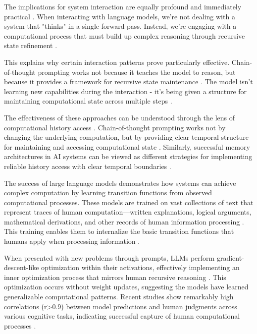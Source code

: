 \documentclass[12pt]{article}
\begin{document}
The implications for system interaction are equally profound and immediately practical \cite{wei2022chain}. When interacting with language models, we're not dealing with a system that "thinks" in a single forward pass. Instead, we're engaging with a computational process that must build up complex reasoning through recursive state refinement \cite{dickson2024trust}.

This explains why certain interaction patterns prove particularly effective. Chain-of-thought prompting works not because it teaches the model to reason, but because it provides a framework for recursive state maintenance \cite{wei2022chain}. The model isn't learning new capabilities during the interaction - it's being given a structure for maintaining computational state across multiple steps \cite{ahn2024recursive}.

The effectiveness of these approaches can be understood through the lens of computational history access \cite{fu2024memory}. Chain-of-thought prompting works not by changing the underlying computation, but by providing clear temporal structure for maintaining and accessing computational state \cite{wei2022chain}. Similarly, successful memory architectures in AI systems can be viewed as different strategies for implementing reliable history access with clear temporal boundaries \cite{yang2013survey}.

The success of large language models demonstrates how systems can achieve complex computation by learning transition functions from observed computational processes. These models are trained on vast collections of text that represent traces of human computation---written explanations, logical arguments, mathematical derivations, and other records of human information processing \cite{brown2020language}. This training enables them to internalize the basic transition functions that humans apply when processing information \cite{wei2022chain}.

When presented with new problems through prompts, LLMs perform gradient-descent-like optimization within their activations, effectively implementing an inner optimization process that mirrors human recursive reasoning \cite{kadavath2022language}. This optimization occurs without weight updates, suggesting the models have learned generalizable computational patterns. Recent studies show remarkably high correlations (r>0.9) between model predictions and human judgments across various cognitive tasks, indicating successful capture of human computational processes \cite{wei2022emergent}.
\end{document}

